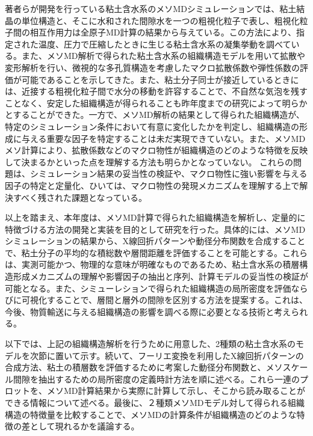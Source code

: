 著者らが開発を行っている粘土含水系のメソMDシミュレーションでは、粘土結晶の単位構造と、そこに水和された間隙水を一つの粗視化粒子で表し、粗視化粒子間の相互作用力は全原子MD計算の結果から与えている。この方法により、指定された温度、圧力で圧縮したときに生じる粘土含水系の凝集挙動を調べている。また、メソMD解析で得られた粘土含水系の組織構造モデルを用いて拡散や変形解析を行い、微視的な多孔質構造を考慮したマクロ拡散係数や弾性係数の評価が可能であることを示してきた。また、粘土分子同士が接近しているときには、近接する粗視化粒子間で水分の移動を許容することで、不自然な気泡を残すことなく、安定した組織構造が得られることも昨年度までの研究によって明らかとすることができた。一方で、メソMD解析の結果として得られた組織構造が、特定のシミュレーション条件において有意に変化したかを判定し、組織構造の形成に与える重要な因子を特定することは未だ実現できていない。また、メソMDメソ計算により、拡散係数などのマクロ物性が組織構造のどのような特徴を反映して決まるかといった点を理解する方法も明らかとなっていない。
これらの問題は、シミュレーション結果の妥当性の検証や、マクロ物性に強い影響を与える因子の特定と定量化、ひいては、マクロ物性の発現メカニズムを理解する上で解決すべく残された課題となっている。

以上を踏まえ、本年度は、メソMD計算で得られた組織構造を解析し、定量的に特徴づける方法の開発と実装を目的として研究を行った。具体的には、メソMDシミュレーションの結果から、X線回折パターンや動径分布関数を合成することで、粘土分子の平均的な積総数や層間距離を評価することを可能とする。これらは、実測可能かつ、物理的な意味が明確なものであるため、粘土含水系の積層構造形成メカニズムの理解や影響因子の抽出と序列、計算モデルの妥当性の検証が可能となる。また、シミューレションで得られた組織構造の局所密度を評価ならびに可視化することで、層間と層外の間隙を区別する方法を提案する。これは、今後、物質輸送に与える組織構造の影響を調べる際に必要となる技術と考えられる。

以下では、上記の組織構造解析を行うために用意した、2種類の粘土含水系のモデルを次節に置いて示す。続いて、フーリエ変換を利用したX線回折パターンの合成方法、粘土の積層数を評価するために考案した動径分布関数と、メソスケール間隙を抽出するための局所密度の定義時計方法を順に述べる。これら一連のプロットを、メソMD計算結果から実際に計算して示し、そこから読み取ることができる情報について述べる。最後に、２種類メソMDモデル対して得られる組織構造の特徴量を比較することで、メソMDの計算条件が組織構造のどのような特徴の差として現れるかを議論する。

